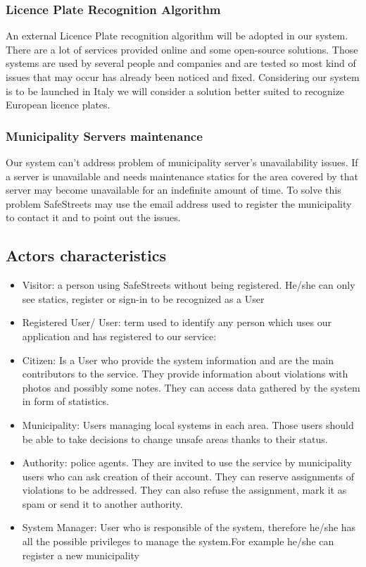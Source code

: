 \subsubsection{Licence Plate Recognition Algorithm}
An external Licence Plate recognition algorithm will be adopted in our system. There are a lot of services provided online and some open-source solutions. Those systems are used by several people and companies and are tested so most kind of issues that may occur has already been noticed and fixed. Considering our system is to be launched in Italy we will consider a solution better suited to recognize European licence plates.
\subsubsection{Municipality Servers maintenance}
Our system can’t address problem of municipality server’s unavailability issues. If a server is unavailable and needs maintenance statics for the area covered by that server may become unavailable for an indefinite amount of time. To solve this problem SafeStreets may use the email address used to register the municipality to contact it and to point out the issues.
\subsection{Actors characteristics}
\begin{itemize}
\item Visitor: a person using SafeStreets without being registered. He/she can only see statics, register or sign-in to be recognized as a User
\item Registered User/ User: term used to identify any person which uses our application and has registered to our service:
\item  Citizen: Is a User who provide the system information and are the main contributors to the service. They provide information about violations with photos and possibly some notes. They can access data gathered by the system in form of statistics.
\item Municipality: Users managing local systems in each area. Those users should be able to take decisions to change unsafe areas thanks to their status.
\item Authority: police agents. They are invited to use the service by municipality users who can ask creation of their account. They can reserve assignments of violations to be addressed. They can also refuse the assignment, mark it as spam or send it to another authority.
\item System Manager: User who is responsible of the system, therefore he/she has all the possible privileges to manage the system.For example he/she can register a new municipality
\end{itemize}
